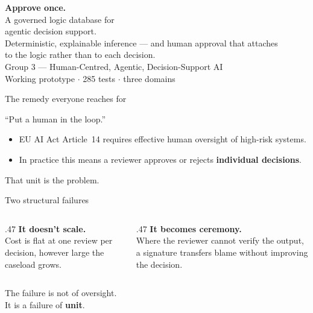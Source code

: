 \documentclass[aspectratio=169,11pt]{beamer}
\begin{document}
{
\begin{frame}[plain]
  \vfill
  {\fontsize{34}{38}\selectfont\color{pinedark}\textbf{Approve once.}}\\[1em]
  {\large\color{ink} A governed logic database for\\
   agentic decision support.}\\[1.2em]
  {\color{muted} Deterministic, explainable inference --- and human approval
  that attaches\\ to the logic rather than to each decision.}\\[2em]
  {\color{muted}\small Group 3 --- Human-Centred, Agentic, Decision-Support AI\\
   Working prototype $\cdot$ 285 tests $\cdot$ three domains}
  \vfill
\end{frame}}

\begin{frame}{The remedy everyone reaches for}
  \vspace{.6em}
  \begin{center}{\Large ``Put a human in the loop.''}\end{center}
  \vspace{1.2em}
  \begin{itemize}
    \setlength\itemsep{.9em}
    \item EU AI Act Article~14 requires effective human oversight of high-risk
      systems.
    \item In practice this means a reviewer approves or rejects
      \textbf{individual decisions}.
  \end{itemize}
  \vspace{1.2em}
  \pause
  \begin{center}\color{amber}\large That unit is the problem.\end{center}
\end{frame}

\begin{frame}{Two structural failures}
  \vspace{.8em}
  \begin{columns}[T]
    \begin{column}{.47\textwidth}
      \textbf{\color{pinedark}It doesn't scale.}\\[.5em]
      {\color{muted}Cost is flat at one review per decision, however large the
      caseload grows.}
    \end{column}
    \begin{column}{.47\textwidth}
      \textbf{\color{pinedark}It becomes ceremony.}\\[.5em]
      {\color{muted}Where the reviewer cannot verify the output, a signature
      transfers blame without improving the decision.}
    \end{column}
  \end{columns}
  \vspace{2em}
  \begin{center}
    The failure is not of oversight.\\[.3em]
    {\large It is a failure of \textbf{\color{pine}unit}.}
  \end{center}
\end{frame}
\end{document}
